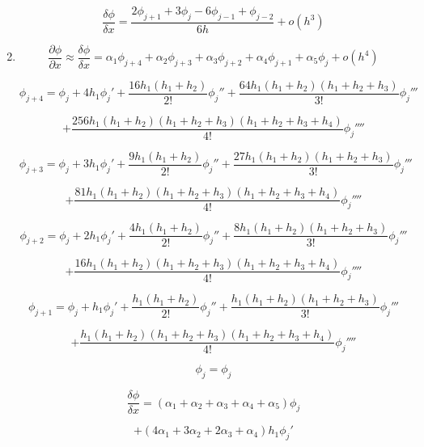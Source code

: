 \documentclass[12pt,a4paper]{report}
\begin{document}
\begin{enumerate}
$$\frac{\delta\phi}{\delta x} = \frac{2\phi_{j+1} + 3\phi_j - 6\phi_{j-1} + \phi_{j-2}}{6h} + o\left(h^3\right)$$


\pagebreak

\item {}

$$\frac{\partial\phi}{\partial x} \approx \frac{\delta\phi}{\delta x} = \alpha_1\phi_{j+4} + \alpha_2\phi_{j+3} + \alpha_3\phi_{j+2} + \alpha_4\phi_{j+1} + \alpha_5\phi_j + o\left(h^4\right)$$

$$\phi_{j+4} = \phi_j + 4h_1{\phi_j}' + \frac{16h_1\left(h_1 + h_2\right)}{2!}{\phi_j}'' + \frac{64h_1\left(h_1 + h_2\right)\left(h_1 + h_2 + h_3\right)}{3!}{\phi_j}'''$$

$$+ \frac{256h_1\left(h_1 + h_2\right)\left(h_1 + h_2 + h_3\right)\left(h_1 + h_2 + h_3 + h_4\right)}{4!}{\phi_j}''''$$

$$\phi_{j+3} = \phi_j + 3h_1{\phi_j}' + \frac{9h_1\left(h_1 + h_2\right)}{2!}{\phi_j}'' + \frac{27h_1\left(h_1 + h_2\right)\left(h_1 + h_2 + h_3\right)}{3!}{\phi_j}'''$$

$$+ \frac{81h_1\left(h_1 + h_2\right)\left(h_1 + h_2 + h_3\right)\left(h_1 + h_2 + h_3 + h_4\right)}{4!}{\phi_j}''''$$

$$\phi_{j+2} = \phi_j + 2h_1{\phi_j}' + \frac{4h_1\left(h_1 + h_2\right)}{2!}{\phi_j}'' + \frac{8h_1\left(h_1 + h_2\right)\left(h_1 + h_2 + h_3\right)}{3!}{\phi_j}'''$$

$$+ \frac{16h_1\left(h_1 + h_2\right)\left(h_1 + h_2 + h_3\right)\left(h_1 + h_2 + h_3 + h_4\right)}{4!}{\phi_j}''''$$

$$\phi_{j+1} = \phi_j + h_1{\phi_j}' + \frac{h_1\left(h_1 + h_2\right)}{2!}{\phi_j}'' + \frac{h_1\left(h_1 + h_2\right)\left(h_1 + h_2 + h_3\right)}{3!}{\phi_j}'''$$

$$+ \frac{h_1\left(h_1 + h_2\right)\left(h_1 + h_2 + h_3\right)\left(h_1 + h_2 + h_3 + h_4\right)}{4!}{\phi_j}''''$$

$$\phi_j = \phi_j$$

\pagebreak

$$\frac{\delta\phi}{\delta x} = \left(\alpha_1 + \alpha_2 + \alpha_3 + \alpha_4 + \alpha_5\right)\phi_j$$

$$+ \left(4\alpha_1 + 3\alpha_2 + 2\alpha_3 + \alpha_4\right)h_1{\phi_j}'$$


\end{enumerate}
\end{document}
